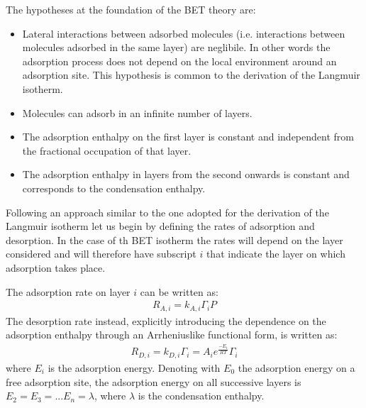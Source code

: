 \documentclass[letterpaper,10pt,english]{jupyterBook}
\begin{document}
\sphinxAtStartPar
The hypotheses at the foundation of the BET theory are:
\begin{itemize}
\item {} 
\sphinxAtStartPar
Lateral interactions between adsorbed molecules (i.e. interactions between molecules adsorbed in the same layer) are neglibile. In other words the adsorption process does not depend on the local environment around an adsorption site. This hypothesis is common to the derivation of the Langmuir isotherm.

\item {} 
\sphinxAtStartPar
Molecules can adsorb in an infinite number of layers.

\item {} 
\sphinxAtStartPar
The adsorption enthalpy on the first layer is constant and independent from the fractional occupation of that layer.

\item {} 
\sphinxAtStartPar
The adsorption enthalpy in layers from the second onwards is constant and corresponds to the condensation enthalpy.

\end{itemize}

\sphinxAtStartPar
Following an approach similar to the one adopted for the derivation of the Langmuir isotherm let us begin by defining the rates of adsorption and desorption. In the case of th BET isotherm the rates will depend on the layer considered and will therefore have subscript \(i\) that indicate the layer on which adsorption takes place.

\sphinxAtStartPar
The adsorption rate on layer \(i\) can be written as:
\begin{equation}\label{equation:BET_isotherm:BETeq1}
\begin{split}
R_{A,i}=k_{A,i}\Gamma_iP
\end{split}
\end{equation}
\sphinxAtStartPar
The desorption rate instead, explicitly introducing the dependence on the adsorption enthalpy through an Arrhenius\sphinxhyphen{}like functional form, is written as:
\begin{equation}\label{equation:BET_isotherm:BETeq2}
\begin{split}
R_{D,i}=k_{D,i}\Gamma_i=A_ie^{\frac{-E_i}{RT}}\Gamma_i
\end{split}
\end{equation}
\sphinxAtStartPar
where \(E_i\) is the adsorption energy. Denoting with \(E_0\) the adsorption energy on a free adsorption site, the adsorption energy on all successive layers is \(E_2=E_3=...E_n=\lambda\), where \(\lambda\) is the condensation enthalpy.
\end{document}
